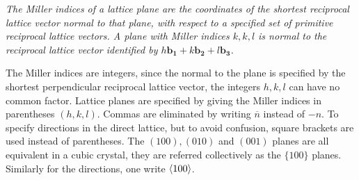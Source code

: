 \documentclass[10.75pt,a4paper,openright,bottom=2cm]{article}
\renewcommand{\Vec}[1]{\boldsymbol{#1}}
\begin{document}
\begin{mybox}
\textit{The Miller indices of a lattice plane are the coordinates of the shortest reciprocal lattice vector normal to that plane, with respect to a specified set of primitive reciprocal lattice vectors. A plane with Miller indices $k,k,l$ is normal to the reciprocal lattice vector identified by $h\Vec{b_1}+k\Vec{b_2}+l\Vec{b_3}$.}
\end{mybox}
\noindent
The Miller indices are integers, since the normal to the plane is specified by the shortest perpendicular reciprocal lattice vector, the integers $h,k,l$ can have no common factor. Lattice planes are specified by giving the Miller indices in parentheses $(h,k,l)$. Commas are eliminated by writing $\overline{n}$ instead of $-n$. To specify directions in the direct lattice, but to avoid confusion, square brackets are used instead of parentheses. The $(100), (010)$ and $(001)$ planes are all equivalent in a cubic crystal, they are referred collectively as the $\{100\}$ planes. Similarly for the directions, one write $\Braket{100}$.
\newpage
\end{document}
